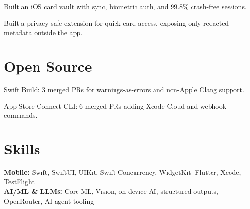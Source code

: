 \documentclass{fonts}
\begin{document}
\textbf{\href{https://apps.apple.com/us/app/offline-card-vault-holder/id6475649492}{}}
\begin{tightemize}
    \item Built an iOS card vault with  sync, biometric auth, and 99.8\% crash-free sessions.
    \item Built a privacy-safe  extension for quick card access, exposing only redacted metadata outside the app.
\end{tightemize}


\section{Open Source}

\textbf{}
\begin{tightemize}
    \item Swift Build: 3 merged PRs for warnings-as-errors and non-Apple Clang support.
    \item App Store Connect CLI: 6 merged PRs adding Xcode Cloud and webhook commands.
\end{tightemize}

\section{Skills}

\noindent
\textbf{Mobile:} Swift, SwiftUI, UIKit, Swift Concurrency, WidgetKit, Flutter, Xcode, TestFlight \\

\noindent
\textbf{AI/ML \& LLMs:} Core ML, Vision, on-device AI, structured outputs, OpenRouter, AI agent tooling \\
\end{document}
